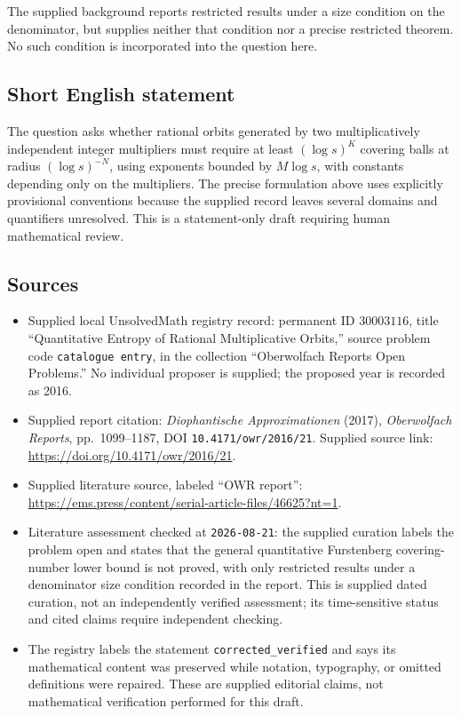 \documentclass[11pt]{article}
\begin{document}
The supplied background reports restricted results under a size condition on the denominator, but supplies neither that condition nor a precise restricted theorem. No such condition is incorporated into the question here.
\subsection{Short English statement}
The question asks whether rational orbits generated by two multiplicatively independent integer multipliers must require at least \((\log s)^K\) covering balls at radius \((\log s)^{-N}\), using exponents bounded by \(M\log s\), with constants depending only on the multipliers. The precise formulation above uses explicitly provisional conventions because the supplied record leaves several domains and quantifiers unresolved. This is a statement-only draft requiring human mathematical review.
\subsection{Sources}
\begin{itemize}
\item Supplied local UnsolvedMath registry record: permanent ID \(30003116\), title ``Quantitative Entropy of Rational Multiplicative Orbits,'' source problem code \texttt{catalogue entry}, in the collection ``Oberwolfach Reports Open Problems.'' No individual proposer is supplied; the proposed year is recorded as 2016.
\item Supplied report citation: \emph{Diophantische Approximationen} (2017), \emph{Oberwolfach Reports}, pp.\ 1099--1187, DOI \texttt{10.4171/owr/2016/21}. Supplied source link: \url{https://doi.org/10.4171/owr/2016/21}.
\item Supplied literature source, labeled ``OWR report'': \url{https://ems.press/content/serial-article-files/46625?nt=1}.
\item Literature assessment checked at \texttt{2026-08-21}: the supplied curation labels the problem open and states that the general quantitative Furstenberg covering-number lower bound is not proved, with only restricted results under a denominator size condition recorded in the report. This is supplied dated curation, not an independently verified assessment; its time-sensitive status and cited claims require independent checking.
\item The registry labels the statement \texttt{corrected\_verified} and says its mathematical content was preserved while notation, typography, or omitted definitions were repaired. These are supplied editorial claims, not mathematical verification performed for this draft.
\end{itemize}
\end{document}
